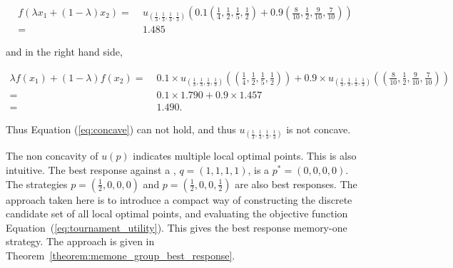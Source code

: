 \begin{align*}
f (\lambda x_1 + (1 - \lambda )x_2 ) = & \; u_{(\frac{1}{3}, \frac{1}{3}, \frac{1}{3}, \frac{1}{3})}
\left( 0.1 \left(\frac{1}{4}, \frac{1}{2}, \frac{1}{5} , \frac{1}{2}\right)
+ 0.9 \left(\frac{8}{10}, \frac{1}{2}, \frac{9}{10} , \frac{7}{10}\right) \right) \\
= & \; 1.485
\end{align*}

and in the right hand side,

\begin{align*}
    \lambda f (x_1 ) + (1 - \lambda )f (x_2 ) = & \; 0.1 \times u_{(\frac{1}{3}, \frac{1}{3}, \frac{1}{3}, \frac{1}{3})}
    \left(\left(\frac{1}{4}, \frac{1}{2}, \frac{1}{5} , \frac{1}{2}\right) \right) 
    + 0.9 \times u_{(\frac{1}{3}, \frac{1}{3}, \frac{1}{3}, \frac{1}{3})}
    \left(\left(\frac{8}{10}, \frac{1}{2}, \frac{9}{10} , \frac{7}{10}\right) \right) \\
    = & \; 0.1 \times 1.790 + 0.9 \times 1.457 \\
    = & \; 1.490.
\end{align*}

Thus Equation (\ref{eq:concave}) can not hold, and thus \(u_{(\frac{1}{3},
\frac{1}{3}, \frac{1}{3}, \frac{1}{3})}\) is not concave.

The non concavity of \(u(p)\) indicates multiple local
optimal points. This is also intuitive. The best response against a \Cooperator,
\(q=(1, 1, 1, 1)\), is a \Defector \(p^*=(0, 0, 0, 0)\). The strategies
\(p=(\frac{1}{2}, 0, 0, 0)\) and \(p=(\frac{1}{2}, 0, 0, \frac{1}{2})\) are also
best responses. The approach taken here is to introduce a compact way of
constructing the discrete candidate set of all local optimal points, and evaluating
the objective function Equation~(\ref{eq:tournament_utility}). This gives the best
response memory-one strategy. The approach is given in
Theorem~\ref{theorem:memone_group_best_response}.

